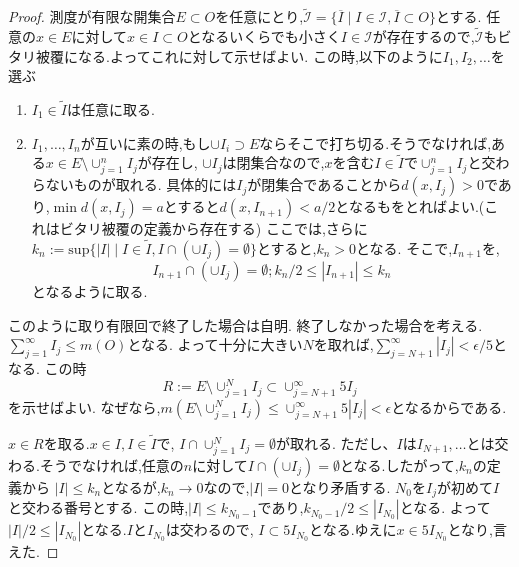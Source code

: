 \begin{proof}
測度が有限な開集合$E \subset O$を任意にとり,$\tilde{\mathcal{I}} =\{\overline{I} \mid I \in \mathcal{I}, \overline{I} \subset O\}$とする.
任意の$x \in E$に対して$x \in I \subset O$となるいくらでも小さく$I \in \mathcal{I}$が存在するので,$\tilde{\mathcal{I}}$もビタリ被覆になる.よってこれに対して示せばよい.
この時,以下のように$I_1, I_2, \ldots$を選ぶ
\begin{enumerate}
    \item $I_1 \in \tilde{I}$は任意に取る.
    \item $I_1, \ldots, I_n$が互いに素の時,もし$\cup I_i \supset E$ならそこで打ち切る.そうでなければ,ある$x \in E \setminus \cup_{j=1}^{n} I_j$が存在し,
    $\cup I_j$は閉集合なので,$x$を含む$I \in \tilde{I}$で$\cup_{j=1}^n I_j$と交わらないものが取れる.
    具体的には$I_j$が閉集合であることから$d(x, I_j) > 0$であり,$\min d(x, I_j) = a$とすると$d(x, I_{n+1}) < a / 2$となるもをとればよい.(これはビタリ被覆の定義から存在する)
    ここでは,さらに
    $k_n:= \mathrm{sup} \{|I| \mid  I \in \tilde{I}, I \cap  (\cup I_j) = \emptyset\}$とすると,$k_n > 0$となる.
    そこで,$I_{n+1}$を,
    \begin{equation*}
        I_{n+1} \cap (\cup I_j) = \emptyset; k_n/2 \le |I_{n+1}| \le k_n
    \end{equation*}
    となるように取る.
\end{enumerate}
このように取り有限回で終了した場合は自明.
終了しなかった場合を考える.
$\sum_{j=1}^{\infty} I_j \le m(O)$となる.
よって十分に大きい$N$を取れば,$\sum_{j=N+1}^{\infty}|I_j| < \epsilon / 5$となる.
この時
\begin{equation*}
    R := E \setminus \cup_{j=1}^N I_j \subset \cup_{j=N+1}^{\infty} 5I_j
\end{equation*}
を示せばよい.
なぜなら,$m(E \setminus \cup_{j=1}^N I_j) \le \cup_{j=N+1}^{\infty} 5|I_j| < \epsilon$となるからである.

$x \in R$を取る.$x \in I, I \in \tilde{I}$で, $I \cap \cup_{j=1}^N I_j = \emptyset$が取れる.
ただし、$I$は$I_{N+1}, \ldots$とは交わる.そうでなければ,任意の$n$に対して$I \cap (\cup I_j) = \emptyset$となる.したがって,$k_n$の定義から
$|I| \le k_n$となるが,$k_n \to 0$なので,$|I| = 0$となり矛盾する.
$N_0$を$I_j$が初めて$I$と交わる番号とする.
この時,$|I| \le k_{N_0 -1}$であり,$k_{N_0-1}/ 2 \le |I_{N_0}|$となる.
よって$|I|/ 2 \le |I_{N_0}|$となる.$I$と$I_{N_0}$は交わるので,
$I \subset 5I_{N_0}$となる.ゆえに$x \in 5I_{N_0}$となり,言えた.

\end{proof}

